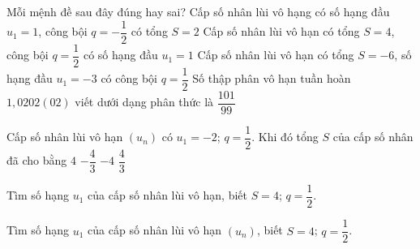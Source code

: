 \begin{ex}%
 Mỗi mệnh đề  sau đây đúng hay sai?
  \choiceTF
  {Cấp số nhân lùi vô hạng có số hạng đầu $u_1=1$, công bội $q=-\dfrac{1}{2}$ có tổng $S=2$} 
  {Cấp số nhân lùi vô hạn có tổng $S=4$, công bội  $q=\dfrac{1}{2}$ có số hạng đầu $u_1=1$}
  {\True Cấp số nhân lùi vô hạn có tổng  $S=-6$, số hạng đầu $u_1=-3$ có công bội $q=\dfrac{1}{2}$}
  {\True Số thập phân vô hạn tuần hoàn $1{,}0202(02)$ viết dưới dạng  phân thức là $\dfrac{101}{99}$}
\end{ex}

\begin{ex}%
	Cấp số nhân lùi vô hạn $\left(u_{n}\right)$ có $u_{1}=-2$; $q=\dfrac{1}{2}$. Khi đó tổng $S$ của cấp số  nhân đã cho bằng
	\choice 
		{$4$} 
		{$-\dfrac{4}{3}$} 
		 {\True $-4$}
		 {$\dfrac{4}{3}$}
\end{ex}

\begin{bt}%
	Tìm số hạng $u_1$ của cấp số nhân lùi vô hạn, biết $S=4$; $q=\dfrac{1}{2}$.
\end{bt}

\begin{ex}%
	Tìm số hạng $u_1$ của cấp số nhân lùi vô hạn $\left(u_n\right)$, biết $S=4$;  $q=\dfrac{1}{2}$.
\end{ex}
